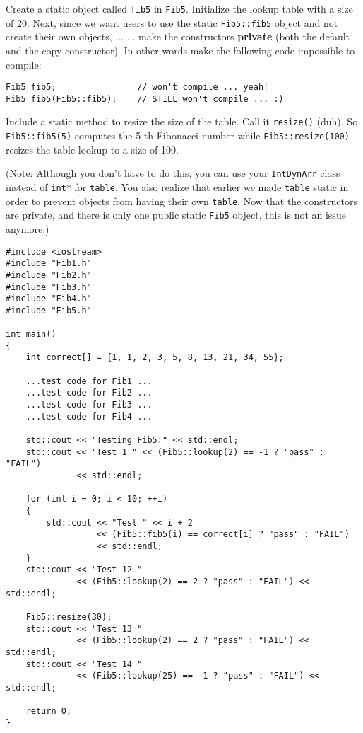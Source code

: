 Create a static object called \verb!fib5! in \texttt{Fib5}. Initialize the lookup table with a size of 20. Next, since we
want users to use the static \texttt{Fib5::fib5} object and not create their own objects, ... 
 ... make the constructors \textbf{private} (both the default and the copy constructor). In other words
make the following code impossible to compile:

\begin{Verbatim}[frame=single]
Fib5 fib5;                // won't compile ... yeah!
Fib5 fib5(Fib5::fib5);    // STILL won't compile ... :)
\end{Verbatim}

Include a static method to resize the size of the table. Call it \texttt{resize()} (duh). So \texttt{Fib5::fib5(5)}
computes the 5 th Fibonacci number while \texttt{Fib5::resize(100)} resizes the table lookup to a size of
100.

(Note: Although you don't have to do this, you can use your \texttt{IntDynArr} class instead of \verb!int*! for
\verb!table!. You also realize that earlier we made \verb!table! static in order to prevent objects from having
their own \verb!table!. Now that the constructors are private, and there is only one public static \texttt{Fib5}
object, this is not an issue anymore.)




\newpage
\begin{Verbatim}[frame=single]
#include <iostream>
#include "Fib1.h"
#include "Fib2.h"
#include "Fib3.h"
#include "Fib4.h"
#include "Fib5.h"

int main()
{
    int correct[] = {1, 1, 2, 3, 5, 8, 13, 21, 34, 55};

    ...test code for Fib1 ...
    ...test code for Fib2 ...
    ...test code for Fib3 ...
    ...test code for Fib4 ...

    std::cout << "Testing Fib5:" << std::endl;
    std::cout << "Test 1 " << (Fib5::lookup(2) == -1 ? "pass" : "FAIL")
              << std::endl;

    for (int i = 0; i < 10; ++i)
    {
        std::cout << "Test " << i + 2
                  << (Fib5::fib5(i) == correct[i] ? "pass" : "FAIL")
                  << std::endl;
    }
    std::cout << "Test 12 "
              << (Fib5::lookup(2) == 2 ? "pass" : "FAIL") << std::endl;

    Fib5::resize(30);
    std::cout << "Test 13 "
              << (Fib5::lookup(2) == 2 ? "pass" : "FAIL") << std::endl;
    std::cout << "Test 14 "
              << (Fib5::lookup(25) == -1 ? "pass" : "FAIL") << std::endl;

    return 0;
}
\end{Verbatim}





